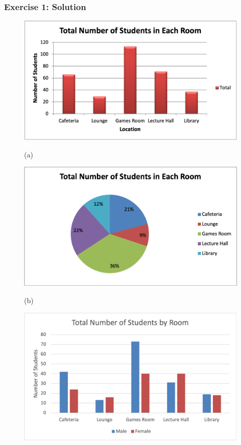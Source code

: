 \documentclass[12pt]{beamer}
\begin{document}
\begin{frame}
	\frametitle{Exercise 1: Solution}
				\begin{figure}[htb]
		\begin{minipage}[t]{0.5\linewidth}\centering
			\includegraphics[width=0.9\linewidth]{Exercise1Bar.png}
			\medskip
			\centerline{(a)}
		\end{minipage}\hfill
		\begin{minipage}[t]{0.5\linewidth}\centering
			\includegraphics[width=0.9\linewidth]{Exercise1Pie.png}
			\medskip
			\centerline{(b)}
		\end{minipage}
		\begin{minipage}[t]{0.45\linewidth}\centering
			\includegraphics[width=0.9\linewidth]{Exercise1ByRoom.png}

\end{minipage}
\end{figure}
\end{frame}
\end{document}

